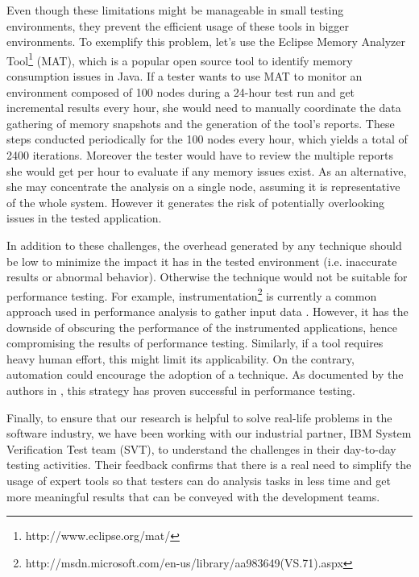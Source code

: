 \documentclass[runningheads,a4paper]{llncs}
\begin{document}
Even though these limitations might be manageable in small testing environments,
they prevent the efficient usage of these tools in bigger environments. To
exemplify this problem, let's use the Eclipse Memory Analyzer
Tool\footnote{http://www.eclipse.org/mat/} (MAT), which is a popular open source
tool to identify memory consumption issues in Java. If a tester wants to use MAT
to monitor an environment composed of 100 nodes during a 24-hour test run and 
get incremental results every hour, she would need to manually coordinate the
data gathering of memory snapshots and the generation of the tool's reports.
These steps conducted periodically for the 100 nodes every hour, which
yields a total of 2400 iterations. Moreover the tester would have to review
the multiple reports she would get per hour to evaluate if any memory issues
exist. As an alternative, she may concentrate the analysis on a single node,
assuming it is representative of the whole system. However it generates the risk of
potentially overlooking issues in the tested application.

In addition to these challenges, the overhead generated by any technique
should be low to minimize the impact it has in the
tested environment (i.e. inaccurate results or abnormal behavior). Otherwise the
technique would not be suitable for performance testing. For example,
instrumentation\footnote{http://msdn.microsoft.com/en-us/library/aa983649(VS.71).aspx}
is currently a common approach used in performance analysis to gather input data
\cite{Yang1,Hangal1,Csallner1,Chen2}. However, it has the downside of obscuring
the performance of the instrumented applications, hence compromising the results of 
performance testing. Similarly, if a tool requires heavy human effort, this might limit its 
applicability. On the contrary, automation could encourage the adoption of a technique. 
As documented by the authors in \cite{Shahamiri1}, this strategy has proven
successful in performance testing.

Finally, to ensure that our research is helpful to solve real-life
problems in the software industry, we have been working with our industrial
partner, IBM System Verification Test team (SVT), to understand the challenges
in their day-to-day testing activities. Their feedback confirms that there is a 
real need to simplify the usage of expert tools so that testers can do
analysis tasks in less time and get more meaningful results that can be
conveyed with the development teams.

\end{document}

